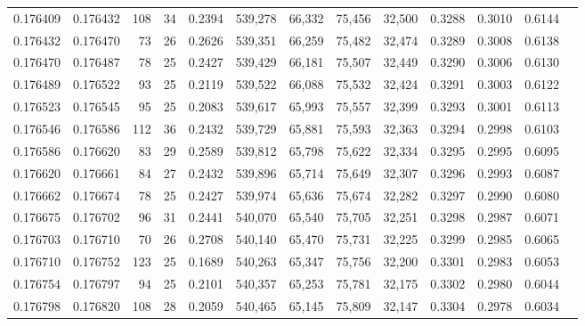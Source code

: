 \begin{tabular}{rrrrrrrrrrrrr}
0.176409 & 0.176432 & 108 &  34 &                                     0.2394 & 539,278 &  66,332 &  75,456 &  32,500 & 0.3288 & 0.3010 & 0.6144 \\
0.176432 & 0.176470 &  73 &  26 &                                     0.2626 & 539,351 &  66,259 &  75,482 &  32,474 & 0.3289 & 0.3008 & 0.6138 \\
0.176470 & 0.176487 &  78 &  25 &                                     0.2427 & 539,429 &  66,181 &  75,507 &  32,449 & 0.3290 & 0.3006 & 0.6130 \\
0.176489 & 0.176522 &  93 &  25 &                                     0.2119 & 539,522 &  66,088 &  75,532 &  32,424 & 0.3291 & 0.3003 & 0.6122 \\
0.176523 & 0.176545 &  95 &  25 &                                     0.2083 & 539,617 &  65,993 &  75,557 &  32,399 & 0.3293 & 0.3001 & 0.6113 \\
0.176546 & 0.176586 & 112 &  36 &                                     0.2432 & 539,729 &  65,881 &  75,593 &  32,363 & 0.3294 & 0.2998 & 0.6103 \\
0.176586 & 0.176620 &  83 &  29 &                                     0.2589 & 539,812 &  65,798 &  75,622 &  32,334 & 0.3295 & 0.2995 & 0.6095 \\
0.176620 & 0.176661 &  84 &  27 &                                     0.2432 & 539,896 &  65,714 &  75,649 &  32,307 & 0.3296 & 0.2993 & 0.6087 \\
0.176662 & 0.176674 &  78 &  25 &                                     0.2427 & 539,974 &  65,636 &  75,674 &  32,282 & 0.3297 & 0.2990 & 0.6080 \\
0.176675 & 0.176702 &  96 &  31 &                                     0.2441 & 540,070 &  65,540 &  75,705 &  32,251 & 0.3298 & 0.2987 & 0.6071 \\
0.176703 & 0.176710 &  70 &  26 &                                     0.2708 & 540,140 &  65,470 &  75,731 &  32,225 & 0.3299 & 0.2985 & 0.6065 \\
0.176710 & 0.176752 & 123 &  25 &                                     0.1689 & 540,263 &  65,347 &  75,756 &  32,200 & 0.3301 & 0.2983 & 0.6053 \\
0.176754 & 0.176797 &  94 &  25 &                                     0.2101 & 540,357 &  65,253 &  75,781 &  32,175 & 0.3302 & 0.2980 & 0.6044 \\
0.176798 & 0.176820 & 108 &  28 &                                     0.2059 & 540,465 &  65,145 &  75,809 &  32,147 & 0.3304 & 0.2978 & 0.6034 \\

\end{tabular}
